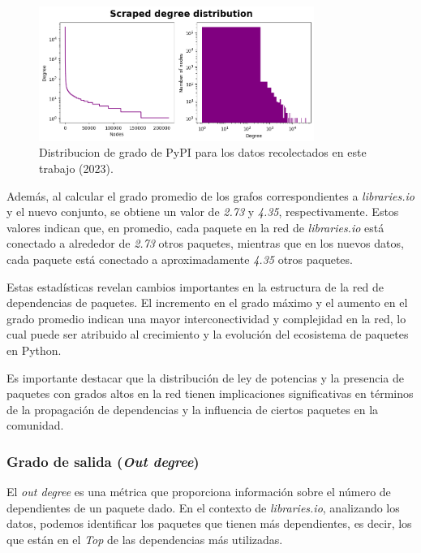 \begin{figure}[ht!]
    \begin{center}
        \includegraphics[width=0.8\textwidth]{img/pypi/scraped_degree_distribution.png}
        \caption{Distribucion de grado de PyPI para los datos recolectados en este trabajo (2023).}
        \label{fig:pypi_scraped_degree_distribution}
    \end{center}
\end{figure}

Además, al calcular el grado promedio de los grafos correspondientes a \textit{libraries.io} y el nuevo
conjunto, se obtiene un valor de \textit{2.73} y \textit{4.35}, respectivamente. Estos valores indican
que, en promedio, cada paquete en la red de \textit{libraries.io} está conectado a alrededor de
\textit{2.73} otros paquetes, mientras que en los nuevos datos, cada paquete está conectado a
aproximadamente \textit{4.35} otros paquetes.

Estas estadísticas revelan cambios importantes en la estructura de la red de dependencias de paquetes.
El incremento en el grado máximo y el aumento en el grado promedio indican una mayor interconectividad
y complejidad en la red, lo cual puede ser atribuido al crecimiento y la evolución del ecosistema de
paquetes en Python.

Es importante destacar que la distribución de ley de potencias y la presencia de paquetes con grados
altos en la red tienen implicaciones significativas en términos de la propagación de dependencias y la
influencia de ciertos paquetes en la comunidad.

\subsubsection{Grado de salida (\textit{Out degree})}

El \textit{out degree} es una métrica que proporciona información
sobre el número de dependientes de un paquete dado. En el contexto de \textit{libraries.io},
analizando los datos, podemos identificar los paquetes que tienen más dependientes, es decir,
los que están en el \textit{Top} de las dependencias más utilizadas.

